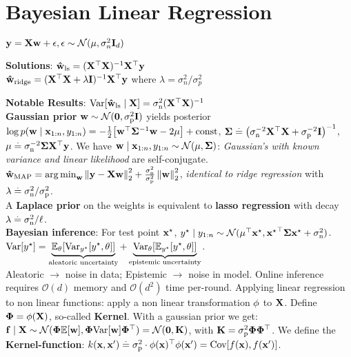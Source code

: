 \section{Bayesian Linear Regression}
\(\vy=\mX\vw+\vepsilon, \vepsilon\sim\N{\vmu}{\sigma_n^2 \mI_d}\)
\begin{framed}
    \textbf{Solutions}:
    $\vwhat_{\ls} = \inv{(\transpose{\mX} \mX)} \transpose{\mX} \vy$  \\
    $\vwhat_{\ridge} = \inv{(\transpose{\mX} \mX + \lambda \mI)} \transpose{\mX} \vy$ where \(\lambda=\sigma_n^2/\sigma_p^2\)
\end{framed}
\textbf{Notable Results}: $\Var{\vwhat_{\ls} \mid \rX} = \sigman^2(\transpose{\rX}\rX)^{-1}$ \\
\textbf{Gaussian prior} $\vw \sim \N{\vzero}{\sigmap^2 \mI}$ yields posterior $\log p(\vw \mid \vx_{1:n}, y_{1:n}) = -\frac{1}{2} \brackets*{\transpose{\vw}\mSigma^{-1}\vw - 2\vmu} + \const$, $\mSigma \defeq \inv{\parentheses*{\sigman^{-2} \transpose{\mX} \mX + \sigmap^{-2} \mI}}$, $\vmu \defeq \sigman^{-2} \mSigma \transpose{\mX} \vy$. We have $\vw \mid \vx_{1:n}, y_{1:n} \sim \N{\vmu}{\mSigma}$: \textit{Gaussian's with known variance and linear likelihood} are self-conjugate. \\
$\vwhat_\MAP = \argmin_\vw \norm{\vy - \mX \vw}_2^2 + \frac{\sigman^2}{\sigmap^2} \norm{\vw}_2^2$, \textit{identical to ridge regression} with $\lambda \defeq \sigman^2 / \sigmap^2$. \\
A \textbf{Laplace prior} on the weights is equivalent to \textbf{lasso regression} with decay ${\lambda \defeq \sigman^2 / \ell}$. \\
\textbf{Bayesian inference}: For test point $\vxs$, $\ys\mid  y_{1:n} \sim \N{\transpose{\vmu} \vxs}{\transpose{\vxs} \mSigma \vxs + \sigman^2}$. \\
$\Var{\ys} = \underbrace{\E[\vtheta]{\Var[\ys]{\ys, \vtheta}}}_{\text{aleatoric uncertainty}} + \underbrace{\Var[\vtheta]{\E[\ys]{\ys, \vtheta}}}_{\text{epistemic uncertainty}}$.\\
Aleatoric $\rightarrow$ noise in data; Epistemic $\rightarrow$ noise in model.
Online inference requires \(\mathcal{O}(d)\) memory and \(\mathcal{O}(d^2)\) time per-round.
Applying linear regression to non linear functions: apply a non linear transformation $\vphi$ to $\rX$. Define $\mPhi = \vphi(\rX)$, so-called \textbf{Kernel}. With a gaussian prior we get: $\vf \mid \mX \sim \N{\mPhi \E{\vw}}{\mPhi \Var{\vw} \transpose{\mPhi}} = \N{\vzero}{\mK}$, with $\mK = \sigmap^2 \mPhi \transpose{\mPhi}$. We define the \textbf{Kernel-function}: $k(\vx, \vxp) \defeq \sigmap^2 \cdot \transpose{\vphi(\vx)} \vphi(\vxp) = \Cov{f(\vx), f(\vxp)}$.
